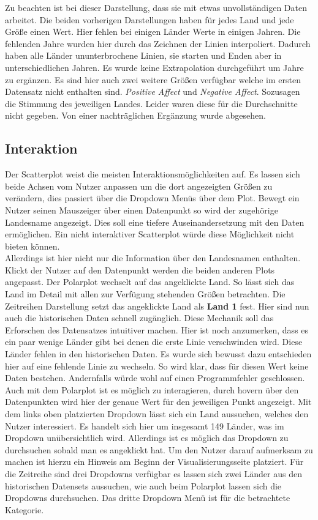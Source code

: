 Zu beachten ist bei dieser Darstellung, dass sie mit etwas unvollständigen Daten arbeitet. Die beiden vorherigen Darstellungen haben für jedes Land und jede Größe einen Wert. Hier fehlen bei einigen Länder Werte in einigen Jahren. Die fehlenden Jahre wurden hier durch das Zeichnen der Linien interpoliert. Dadurch haben alle Länder ununterbrochene Linien, sie starten und Enden aber in unterschiedlichen Jahren. Es wurde keine Extrapolation durchgeführt um Jahre zu ergänzen. Es sind hier auch zwei weitere Größen verfügbar welche im ersten Datensatz nicht enthalten sind. \textit{Positive Affect} und \textit{Negative Affect}. Sozusagen die Stimmung des jeweiligen Landes. Leider waren diese für die Durchschnitte nicht gegeben. Von einer nachträglichen Ergänzung wurde abgesehen. 

\subsection{Interaktion}

Der Scatterplot weist die meisten Interaktionsmöglichkeiten auf. Es lassen sich beide Achsen vom Nutzer anpassen um die dort angezeigten Größen zu verändern, dies passiert über die Dropdown Menüs über dem Plot. Bewegt ein Nutzer seinen Mauszeiger über einen Datenpunkt so wird der zugehörige Landesname angezeigt. Dies soll eine tiefere Auseinandersetzung mit den Daten ermöglichen. Ein nicht interaktiver Scatterplot würde diese Möglichkeit nicht bieten können. \\

Allerdings ist hier nicht nur die Information über den Landesnamen enthalten. Klickt der Nutzer auf den Datenpunkt werden die beiden anderen Plots angepasst. Der Polarplot wechselt auf das angeklickte Land. So lässt sich das Land im Detail mit allen zur Verfügung stehenden Größen betrachten. Die Zeitreihen Darstellung setzt das angeklickte Land als \textbf{Land 1} fest. Hier sind nun auch die historischen Daten schnell zugänglich. Diese Mechanik soll das Erforschen des Datensatzes intuitiver machen. Hier ist noch anzumerken, dass es ein paar wenige Länder gibt bei denen die erste Linie verschwinden wird. Diese Länder fehlen in den historischen Daten. Es wurde sich bewusst dazu entschieden hier auf eine fehlende Linie zu wechseln. So wird klar, dass für diesen Wert keine Daten bestehen. Andernfalls würde wohl auf einen Programmfehler geschlossen.\\

Auch mit dem Polarplot ist es möglich zu interagieren, durch hovern über den Datenpunkten wird hier der genaue Wert für den jeweiligen Punkt angezeigt. 
Mit dem links oben platzierten Dropdown lässt sich ein Land aussuchen, welches den Nutzer interessiert. Es handelt sich hier um insgesamt 149 Länder, was im Dropdown unübersichtlich wird. Allerdings ist es möglich das Dropdown zu durchsuchen sobald man es angeklickt hat. Um den Nutzer darauf aufmerksam zu machen ist hierzu ein Hinweis  am Beginn der Visualisierungsseite platziert. Für die Zeitreihe sind drei Dropdowns verfügbar es lassen sich zwei Länder aus den historischen Datensets aussuchen, wie auch beim Polarplot lassen sich die Dropdowns durchsuchen. Das dritte Dropdown Menü ist für die betrachtete Kategorie.